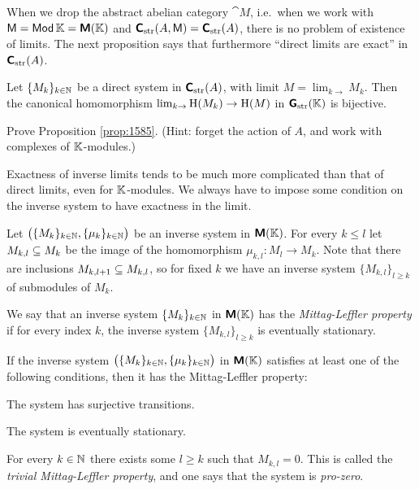 When we drop the abstract abelian category $\cat{M}$, i.e.\ when we work 
with $\operatorname{\mathsf{M}} = \operatorname{\mathsf{Mod}} \mathbb{K} =  \boldsymbol{\mathsf{M}}(\mathbb{K})$ and 
$\boldsymbol{\mathsf{C}}_{\mathrm{str}}(A, \operatorname{\mathsf{M}}) = \boldsymbol{\mathsf{C}}_{\mathrm{str}}(A)$, 
there is no problem of 
existence of limits. The next proposition says that furthermore ``direct limits 
are exact'' in $\operatorname{\boldsymbol{\mathsf{C}}}_{\mathrm{str}}(A)$. 

\begin{prop} \label{prop:1585}
Let $\{ M_k \}_{k \in \mathbb{N}}$ be a direct system in $\operatorname{\boldsymbol{\mathsf{C}}}_{\mathrm{str}}(A)$,
with limit $M = \lim_{k \to} M_k$. 
Then the canonical homomorphism 
$\lim_{k \to} \operatorname{H}(M_k) \to \operatorname{H}(M)$ 
in $\boldsymbol{\mathsf{G}}_{\mathrm{str}}(\mathbb{K})$ is bijective. 
\end{prop}

\begin{exer}  \label{exer:1741}
Prove Proposition \ref{prop:1585}. (Hint: forget the action of $A$, and work 
with complexes of $\mathbb{K}$-modules.)
\end{exer}

Exactness of inverse limits tends to be much more complicated than that of 
direct limits, even for $\mathbb{K}$-modules. We always have to impose some condition 
on the inverse system to have exactness in the limit. 

Let 
$\bigl( \{ M_k \}_{k \in \mathbb{N}}, \{ \mu_k \}_{k \in \mathbb{N}} \bigr)$
be an inverse system in $\operatorname{\boldsymbol{\mathsf{M}}}(\mathbb{K})$.
For every $k \leq l$ let 
$M_{k, l} \subseteq M_k$ be the image of the homomorphism
$\mu_{k, l} : M_l \to M_k$.
Note that there are inclusions 
$M_{k, l + 1} \subseteq M_{k, l}$, so for fixed $k$ we have an inverse system 
$\{ M_{k, l} \}_{l \geq k}$
of submodules of $M_k$. 

\begin{dfn} \label{dfn:1590}
We say that an inverse system $\{ M_k \}_{k \in \mathbb{N}}$ in $\operatorname{\boldsymbol{\mathsf{M}}}(\mathbb{K})$
has the {\em Mittag-Leffler property}%
if for every index $k$, the 
inverse system $\{ M_{k, l} \}_{l \geq k}$ 
is eventually stationary.
\end{dfn}

\begin{exa} \label{exa:1590}
If the inverse system 
$\bigl( \{ M_k \}_{k \in \mathbb{N}}, \{ \mu_k \}_{k \in \mathbb{N}} \bigr)$
in $\operatorname{\boldsymbol{\mathsf{M}}}(\mathbb{K})$ satisfies at least one of the following conditions, then it 
has the  Mittag-Leffler property:
\begin{itemize}
 The system has surjective transitions. 

 The system is eventually stationary. 

 For every $k \in \mathbb{N}$ there exists some $l \geq k$ such that
$M_{k, l} = 0$. This is called the {\em trivial Mittag-Leffler property}, and 
one says that the system is {\em pro-zero}. 
\end{itemize}
\end{exa}

